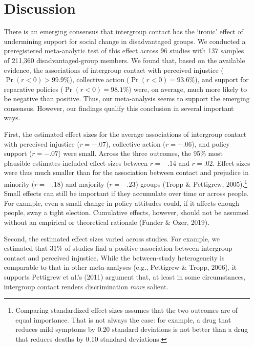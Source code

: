 \documentclass[12pt, letterpaper]{article}
\begin{document}
\hypertarget{discussion}{%
\section{Discussion}\label{discussion}}

There is an emerging consensus that intergroup contact has the `ironic'
effect of undermining support for social change in disadvantaged groups.
We conducted a preregistered meta-analytic test of this effect across 96
studies with 137 samples of 211,360 disadvantaged-group members. We
found that, based on the available evidence, the associations of
intergroup contact with perceived injustice (\(\Pr (r < 0) > 99.9\%\)),
collective action (\(\Pr (r < 0) = 93.6\%\)), and support for reparative
policies (\(\Pr (r < 0) = 98.1\%\)) were, on average, much more likely
to be negative than positive. Thus, our meta-analysis seems to support
the emerging consensus. However, our findings qualify this conclusion in
several important ways.

First, the estimated effect sizes for the average associations of
intergroup contact with perceived injustice (\(r = -.07\)), collective
action (\(r = -.06\)), and policy support (\(r = -.07\)) were small.
Across the three outcomes, the 95\% most plausible estimates included
effect sizes between \(r = -.14\) and \(r = .02\). Effect sizes were
thus much smaller than for the association between contact and prejudice
in minority (\(r = -.18\)) and majority (\(r = -.23\)) groups (Tropp \&
Pettigrew, 2005).\footnote{Comparing standardized effect sizes assumes
  that the two outcomes are of equal importance. That is not always the
  case: for example, a drug that reduces mild symptoms by 0.20 standard
  deviations is not better than a drug that reduces deaths by 0.10
  standard deviations.} Small effects can still be important if they
accumulate over time or across people. For example, even a small change
in policy attitudes could, if it affects enough people, sway a tight
election. Cumulative effects, however, should not be assumed without an
empirical or theoretical rationale (Funder \& Ozer, 2019).

Second, the estimated effect sizes varied across studies. For example,
we estimated that 31\% of studies find a positive association between
intergroup contact and perceived injustice. While the between-study
heterogeneity is comparable to that in other meta-analyses (e.g.,
Pettigrew \& Tropp, 2006), it supports Pettigrew et al.'s (2011)
argument that, at least in some circumstances, intergroup contact
renders discrimination \emph{more} salient.
\end{document}
